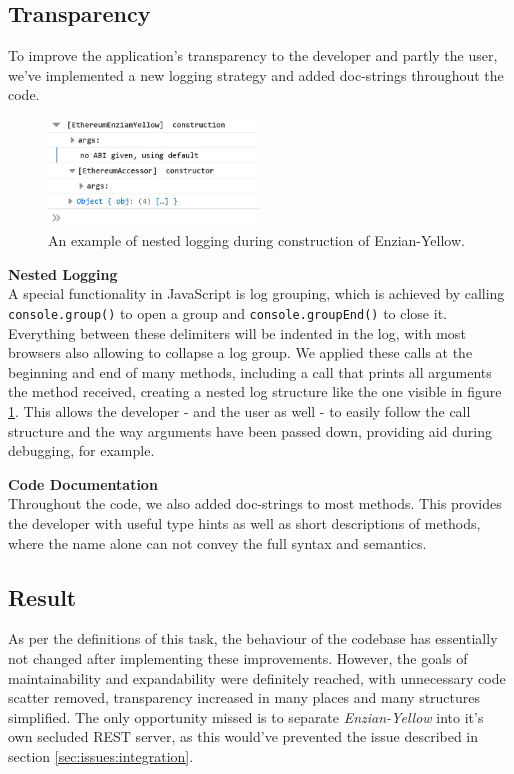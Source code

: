 \subsection{Transparency}
\label{sec:impr:enzian:log}
To improve the application's transparency to the developer and partly the user, we've implemented a new logging strategy and added doc-strings throughout the code.

\begin{figure}[h]
	\centering
	\captionsetup{justification=centering,margin=2cm}
	\includegraphics[width=0.5\textwidth]{gfx/enzian-transparency}
	\caption{An example of nested logging during construction of Enzian-Yellow.}
	\label{fig:impr:enzian:transparency}
\end{figure}

\textbf{Nested Logging} \\[0.2em]
A special functionality in JavaScript is log grouping, which is achieved by calling \texttt{console.group()} to open a group and \texttt{console.groupEnd()} to close it. Everything between these delimiters will be indented in the log, with most browsers also allowing to collapse a log group. We applied these calls at the beginning and end of many methods, including a call that prints all arguments the method received, creating a nested log structure like the one visible in figure \ref{fig:impr:enzian:transparency}. This allows the developer - and the user as well - to easily follow the call structure and the way arguments have been passed down, providing aid during debugging, for example. 

\textbf{Code Documentation} \\[0.2em]
Throughout the code, we also added doc-strings to most methods. This provides the developer with useful type hints as well as short descriptions of methods, where the name alone can not convey the full syntax and semantics. 

\subsection{Result}
\label{sec:impr:enzian:result}

As per the definitions of this task, the behaviour of the codebase has essentially not changed after implementing these improvements. However, the goals of maintainability and expandability were definitely reached, with unnecessary code scatter removed, transparency increased in many places and many structures simplified. \newline
The only opportunity missed is to separate \emph{Enzian-Yellow} into it's own secluded REST server, as this would've prevented the issue described in section \ref{sec:issues:integration}.
